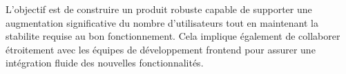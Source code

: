 L'objectif est de construire un produit robuste capable de supporter une
augmentation significative du nombre d'utilisateurs tout en maintenant la
stabilite requise au bon fonctionnement. Cela implique également de collaborer
étroitement avec les équipes de développement frontend pour assurer une
intégration fluide des nouvelles fonctionnalités.

